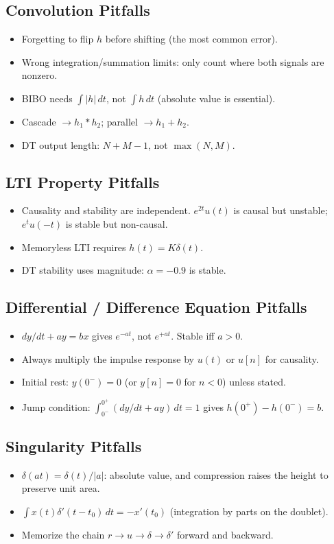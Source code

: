 \documentclass[11pt]{article}
\newcommand{\Conv}{\ast}
\begin{document}
\subsection{Convolution Pitfalls}
\begin{itemize}[leftmargin=*]
  \item Forgetting to flip $h$ before shifting (the most common error).
  \item Wrong integration/summation limits: only count where both signals are nonzero.
  \item BIBO needs $\int|h|\,dt$, not $\int h\,dt$ (absolute value is essential).
  \item Cascade $\to h_1\Conv h_2$; parallel $\to h_1+h_2$.
  \item DT output length: $N+M-1$, not $\max(N,M)$.
\end{itemize}

\subsection{LTI Property Pitfalls}
\begin{itemize}[leftmargin=*]
  \item Causality and stability are independent. $e^{2t}u(t)$ is causal but unstable; $e^t u(-t)$ is stable but non-causal.
  \item Memoryless LTI requires $h(t)=K\delta(t)$.
  \item DT stability uses magnitude: $\alpha=-0.9$ is stable.
\end{itemize}

\subsection{Differential / Difference Equation Pitfalls}
\begin{itemize}[leftmargin=*]
  \item $dy/dt+ay=bx$ gives $e^{-at}$, not $e^{+at}$. Stable iff $a>0$.
  \item Always multiply the impulse response by $u(t)$ or $u[n]$ for causality.
  \item Initial rest: $y(0^-)=0$ (or $y[n]=0$ for $n<0$) unless stated.
  \item Jump condition: $\int_{0^-}^{0^+}(dy/dt+ay)\,dt = 1$ gives $h(0^+)-h(0^-)=b$.
\end{itemize}

\subsection{Singularity Pitfalls}
\begin{itemize}[leftmargin=*]
  \item $\delta(at) = \delta(t)/|a|$: absolute value, and compression raises the height to preserve unit area.
  \item $\int x(t)\delta'(t-t_0)\,dt = -x'(t_0)$ (integration by parts on the doublet).
  \item Memorize the chain $r\to u\to\delta\to\delta'$ forward and backward.
\end{itemize}
\end{document}
